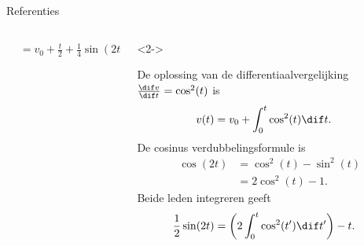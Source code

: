 \begin{frame}[fragile,t]{Referenties}
\begin{columns}[t]
\begin{column}{0.5\textwidth}
{\begin{adjustbox}{frame=1pt 10pt,valign=t}
\begin{minipage}{\textwidth-22pt}
{\begin{align*}
                                     & = v_0 + \frac{t}{2} + \frac{1}{4}\sin(2t)
                            \end{align*}}
                    \vspace{-20pt}
                \end{minipage}
            \end{adjustbox}}
        \end{column}
        \begin{column}{0.5\textwidth}
            \begin{onlyenv}<2->%
                \begin{adjustbox}{frame=1pt 10pt,valign=t}%
                    \begin{minipage}{\textwidth-22pt}
                        {\tiny\setlength{\abovedisplayskip}{6pt}%
                            \setlength{\belowdisplayskip}{6pt}%
                            \setlength{\abovedisplayshortskip}{0pt}%
                            \setlength{\belowdisplayshortskip}{0pt}%
                            \setcounter{equation}{0}%
                            De oplossing van de differentiaalvergelijking $ \frac{\dif v}{\dif t} = \cos^2(t) $ is
                            \begin{align}
                                v(t) & = v_0 + \int_{0}^{t}\cos^2(t)\dif t.
                            \end{align}
                            De cosinus verdubbelingsformule is
                            \begin{align*}
                                \cos(2t) & = \cos^2(t) - \sin^2(t) \\
                                         & = 2\cos^2(t)-1.
                            \end{align*}
                            Beide leden integreren geeft
                            \begin{align*}
                                \frac{1}{2}\sin(2t) & = \left(2\int_0^t\cos^2(t')\dif t'\right) - t.
                            \end{align*}
}
\end{minipage}
\end{adjustbox}
\end{onlyenv}
\end{column}
\end{columns}
\end{frame}
